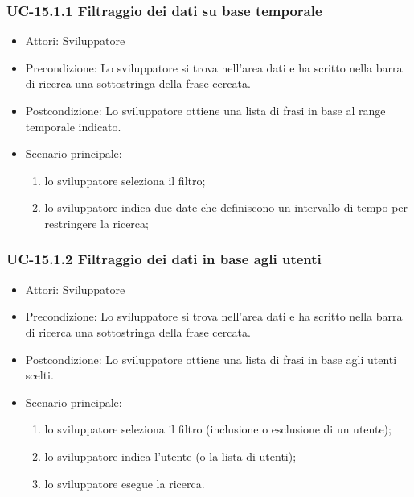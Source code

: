 	
	\subsubsection{UC-15.1.1 Filtraggio dei dati su base temporale}	
		\begin{itemize}
			\item Attori: Sviluppatore
			\item Precondizione: Lo sviluppatore si trova nell'area dati e ha scritto nella barra di ricerca una sottostringa della frase cercata.
			\item Postcondizione: Lo sviluppatore ottiene una lista di frasi in base al range temporale indicato.
			\item Scenario principale:
				\begin{enumerate}
					\item lo sviluppatore seleziona il filtro;
					\item lo sviluppatore indica due date che definiscono un intervallo di tempo per restringere la ricerca;
				\end{enumerate}
		\end{itemize}	
	
	\subsubsection{UC-15.1.2 Filtraggio dei dati in base agli utenti}	
		\begin{itemize}
			\item Attori: Sviluppatore
			\item Precondizione: Lo sviluppatore si trova nell'area dati e ha scritto nella barra di ricerca una sottostringa della frase cercata.
			\item Postcondizione: Lo sviluppatore ottiene una lista di frasi in base agli utenti scelti.
			\item Scenario principale:
				\begin{enumerate}
					\item lo sviluppatore seleziona il filtro (inclusione o esclusione di un utente);
					\item lo sviluppatore indica l'utente (o la lista di utenti);
					\item lo sviluppatore esegue la ricerca.
				\end{enumerate}
		\end{itemize}	
	
